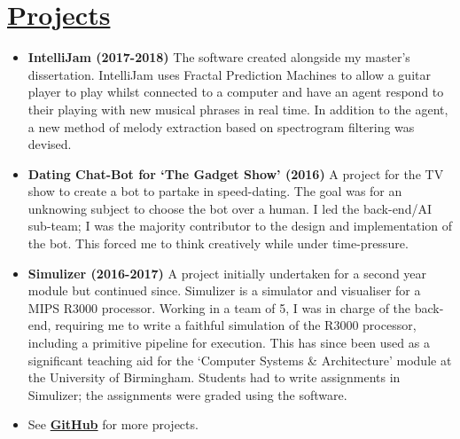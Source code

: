 \documentclass[11pt]{article}
\begin{document}
	\vspace{-20pt}
	\hspace{-100pt}\section*{\underline{Projects}} %
			\begin{itemize}
				\item \textbf{IntelliJam (2017-2018)} The software created alongside my master's dissertation. IntelliJam uses Fractal Prediction Machines to allow a guitar player to play whilst connected to a computer and have an agent respond to their playing with new musical phrases in real time. In addition to the agent, a new method of melody extraction based on spectrogram filtering was devised.
				\item \textbf{Dating Chat-Bot for `The Gadget Show' (2016)} A project for the TV show to create a bot to partake in speed-dating. The goal was for an unknowing subject to choose the bot over a human. I led the back-end/AI sub-team; I was the majority contributor to the design and implementation of the bot. This forced me to think creatively while under time-pressure.
				\item \textbf{Simulizer (2016-2017)} A project initially undertaken for a second year module but continued since. Simulizer is a simulator and visualiser for a MIPS R3000 processor. Working in a team of 5, I was in charge of the back-end, requiring me to write a faithful simulation of the R3000 processor, including a primitive pipeline for execution. This has since been used as a significant teaching aid for the `Computer Systems \& Architecture' module at the University of Birmingham. Students had to write assignments in Simulizer; the assignments were graded using the software. 
				\item See \textbf{\href{https://github.com/charlie1329/}{GitHub}} for more projects.
			\end{itemize}
\end{document}
